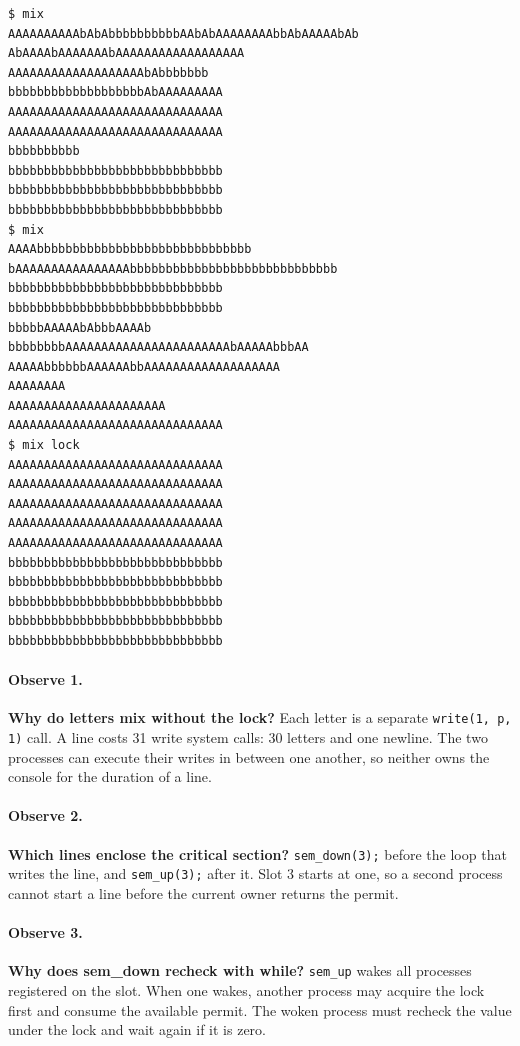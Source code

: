 \documentclass[12pt,a4paper]{article}
\begin{document}
\begin{lstlisting}[caption={Two unlocked mix runs and one locked run}]
$ mix
AAAAAAAAAAbAbAbbbbbbbbbbAAbAbAAAAAAAAbbAbAAAAAbAb
AbAAAAbAAAAAAAbAAAAAAAAAAAAAAAAAA
AAAAAAAAAAAAAAAAAAAbAbbbbbbb
bbbbbbbbbbbbbbbbbbbAbAAAAAAAAA
AAAAAAAAAAAAAAAAAAAAAAAAAAAAAA
AAAAAAAAAAAAAAAAAAAAAAAAAAAAAA
bbbbbbbbbb
bbbbbbbbbbbbbbbbbbbbbbbbbbbbbb
bbbbbbbbbbbbbbbbbbbbbbbbbbbbbb
bbbbbbbbbbbbbbbbbbbbbbbbbbbbbb
$ mix
AAAAbbbbbbbbbbbbbbbbbbbbbbbbbbbbbb
bAAAAAAAAAAAAAAAAbbbbbbbbbbbbbbbbbbbbbbbbbbbbb
bbbbbbbbbbbbbbbbbbbbbbbbbbbbbb
bbbbbbbbbbbbbbbbbbbbbbbbbbbbbb
bbbbbAAAAAbAbbbAAAAb
bbbbbbbbAAAAAAAAAAAAAAAAAAAAAAAbAAAAAbbbAA
AAAAAbbbbbbAAAAAAbbAAAAAAAAAAAAAAAAAAA
AAAAAAAA
AAAAAAAAAAAAAAAAAAAAAA
AAAAAAAAAAAAAAAAAAAAAAAAAAAAAA
$ mix lock
AAAAAAAAAAAAAAAAAAAAAAAAAAAAAA
AAAAAAAAAAAAAAAAAAAAAAAAAAAAAA
AAAAAAAAAAAAAAAAAAAAAAAAAAAAAA
AAAAAAAAAAAAAAAAAAAAAAAAAAAAAA
AAAAAAAAAAAAAAAAAAAAAAAAAAAAAA
bbbbbbbbbbbbbbbbbbbbbbbbbbbbbb
bbbbbbbbbbbbbbbbbbbbbbbbbbbbbb
bbbbbbbbbbbbbbbbbbbbbbbbbbbbbb
bbbbbbbbbbbbbbbbbbbbbbbbbbbbbb
bbbbbbbbbbbbbbbbbbbbbbbbbbbbbb
\end{lstlisting}

\paragraph{Observe 1.} \textbf{Why do letters mix without the lock?} Each letter is a separate \texttt{write(1, p, 1)} call. A line costs 31 write system calls: 30 letters and one newline. The two processes can execute their writes in between one another, so neither owns the console for the duration of a line.

\paragraph{Observe 2.} \textbf{Which lines enclose the critical section?} \texttt{sem\_down(3);} before the loop that writes the line, and \texttt{sem\_up(3);} after it. Slot 3 starts at one, so a second process cannot start a line before the current owner returns the permit.

\paragraph{Observe 3.} \textbf{Why does sem\_down recheck with while?} \texttt{sem\_up} wakes all processes registered on the slot. When one wakes, another process may acquire the lock first and consume the available permit. The woken process must recheck the value under the lock and wait again if it is zero.
\end{document}
